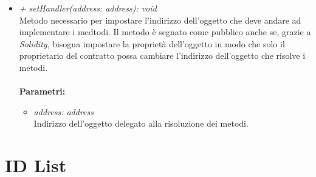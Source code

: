 \begin{itemize}
\begin{itemize}
\begin{itemize}
		\end{itemize}
		\item \textit{+ setHandler(address: address): void}\\
		Metodo necessario per impostare l'indirizzo dell'oggetto che deve andare ad implementare i medtodi. Il metodo è segnato come pubblico anche se, grazie a \textit{Solidity}, bisogna impostare la proprietà dell'oggetto in modo che solo il proprietario del contratto possa cambiare l'indirizzo dell'oggetto che risolve i metodi.\\\\
		\textbf{Parametri:}
		\begin{itemize}
			\item \textit{address: address}\\
			Indirizzo dell'oggetto delegato alla risoluzione dei metodi.
		\end{itemize}
	\end{itemize}
\end{itemize}
\section{ID List}
